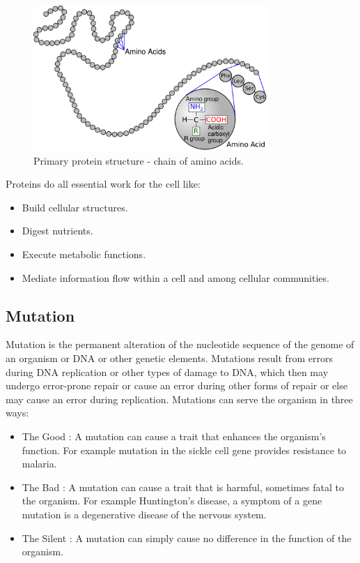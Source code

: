 \begin{figure}[!tb]
	\centering
	\includegraphics[width=0.8\textwidth]{figures/protein}
	\caption{Primary protein structure - chain of amino acids.}
	\label{fig:protein}
\end{figure}

Proteins do all essential work for the cell like:
\begin{itemize}
	\item Build cellular structures.
	\item Digest nutrients.
	\item Execute metabolic functions.
	\item Mediate information flow within a cell and among cellular communities. 
\end{itemize}

\subsection{Mutation}
Mutation is the permanent alteration of the nucleotide sequence of the genome of an organism or DNA or other genetic elements. Mutations result from errors during DNA replication or other types of damage to DNA, which then may undergo error-prone repair or cause an error during other forms of repair or else may cause an error during replication. Mutations can serve the organism in three ways:
\begin{itemize}
	\item The Good : A mutation can cause a trait that enhances the organism’s function. For example mutation in the sickle cell gene provides resistance to malaria.
	\item The Bad : A mutation can cause a trait that is harmful, sometimes fatal to the organism. For example Huntington’s disease, a symptom of a gene mutation is a degenerative disease of the nervous system.
	\item The Silent : A mutation can simply cause no difference in the function of the organism.
\end{itemize}



